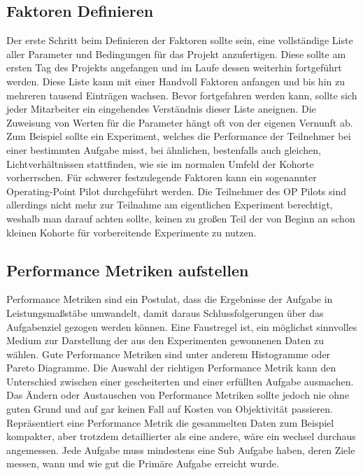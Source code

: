     \subsection{Faktoren Definieren}

    Der erste Schritt beim Definieren der Faktoren sollte sein, eine vollständige Liste aller 
    Parameter und Bedingungen für das Projekt anzufertigen. Diese sollte am ersten Tag des Projekts 
    angefangen und im Laufe dessen weiterhin fortgeführt werden. Diese Liste kann mit einer Handvoll 
    Faktoren anfangen und bis hin zu mehreren tausend Einträgen wachsen. 
    Bevor fortgefahren werden kann, sollte sich jeder Mitarbeiter ein eingehendes Verständnis dieser 
    Liste aneignen. 
    Die Zuweisung von Werten für die Parameter hängt oft von der eigenen Vernunft ab. Zum Beispiel 
    sollte ein Experiment, welches die Performance der Teilnehmer bei einer bestimmten Aufgabe misst, 
    bei ähnlichen, bestenfalls auch gleichen, Lichtverhältnissen stattfinden, wie sie im normalen 
    Umfeld der Kohorte vorherrschen. Für schwerer festzulegende Faktoren kann ein sogenannter 
    Operating-Point Pilot durchgeführt werden. Die Teilnehmer des OP Pilots sind allerdings nicht 
    mehr zur Teilnahme am eigentlichen Experiment berechtigt, weshalb man darauf achten sollte, 
    keinen zu großen Teil der von Beginn an schon kleinen Kohorte für vorbereitende Experimente zu nutzen.

    \subsection{Performance Metriken aufstellen}

    Performance Metriken sind ein Postulat, dass die Ergebnisse der Aufgabe in Leistungsmaßstäbe 
    umwandelt, damit daraus Schlussfolgerungen über das Aufgabenziel gezogen werden können. Eine 
    Faustregel ist, ein möglichst sinnvolles Medium zur Darstellung der aus den Experimenten gewonnenen 
    Daten zu wählen. Gute Performance Metriken sind unter anderem Histogramme oder Pareto Diagramme. 
    Die Auswahl der richtigen Performance Metrik kann den Unterschied zwischen einer gescheiterten 
    und einer erfüllten Aufgabe ausmachen. Das Ändern oder Austauschen von Performance Metriken 
    sollte jedoch nie ohne guten Grund und auf gar keinen Fall auf Kosten von Objektivität 
    passieren. Repräsentiert eine Performance Metrik die gesammelten Daten zum Beispiel kompakter, 
    aber trotzdem detaillierter als eine andere, wäre ein wechsel durchaus angemessen. Jede 
    Aufgabe muss mindestens eine Sub Aufgabe haben, deren Ziele messen, wann und wie gut die 
    Primäre Aufgabe erreicht wurde.


